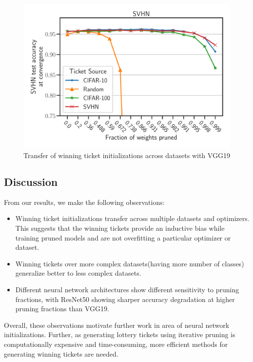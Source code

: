 \begin{figure}[]
\begin{minipage}{.497\textwidth}
        \includegraphics[width=\textwidth]{../openreview/plots/Exp2_VGG_SVHN_N.pdf}
        \end{minipage}
        \caption{Transfer of winning ticket initializations across datasets with VGG19}
        \label{fig:exp2_vgg}
    \end{figure}
    
    \subsection{Discussion}
     From our results, we make the following observations:
    \begin{itemize}
        \item Winning ticket initializations transfer across multiple datasets and optimizers. This suggests that the winning tickets provide an inductive bias while training pruned models  and are not overfitting a particular optimizer or dataset.
        \item Winning tickets over more complex datasets(having more number of classes) generalize better to less complex datasets.
        \item  Different neural network architectures show different sensitivity to pruning fractions, with ResNet50 showing sharper accuracy degradation at higher pruning fractions than VGG19.
    \end{itemize}
     Overall, these observations motivate further work in area of neural network initializations. Further, as generating lottery tickets using iterative pruning is computationally expensive and time-consuming, more efficient methods for generating winning tickets are needed.
    
